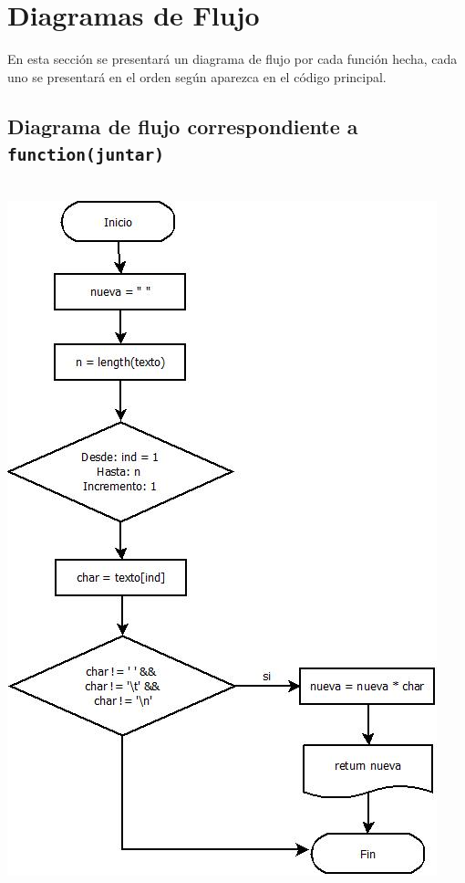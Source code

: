 \documentclass{article}
\begin{document}
\section{Diagramas de Flujo}
En esta sección se presentará un diagrama de flujo por cada función hecha, cada uno se presentará en el orden según aparezca en el código principal.

\subsection{Diagrama de flujo correspondiente a \texttt{function(juntar)}}\\
\includegraphics[scale=1]{Diagrama1.jpeg}
\end{document}
